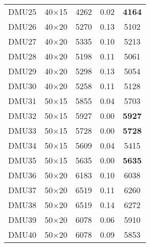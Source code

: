 \begin{table}[H]
\begin{tabular}{@{}ccccc@{}}
DMU25 & 40$\times$15 & 4262 & 0.02 & \textbf{4164}\\ 
DMU26 & 40$\times$20 & 5270 & 0.13 & 5102\\ 
DMU27 & 40$\times$20 & 5335 & 0.10 & 5213\\ 
DMU28 & 40$\times$20 & 5198 & 0.11 & 5061\\ 
DMU29 & 40$\times$20 & 5298 & 0.13 & 5054\\ 
DMU30 & 40$\times$20 & 5258 & 0.11 & 5128\\ 
DMU31 & 50$\times$15 & 5855 & 0.04 & 5703\\ 
DMU32 & 50$\times$15 & 5927 & 0.00 & \textbf{5927}\\ 
DMU33 & 50$\times$15 & 5728 & 0.00 & \textbf{5728}\\ 
DMU34 & 50$\times$15 & 5609 & 0.04 & 5415\\ 
DMU35 & 50$\times$15 & 5635 & 0.00 & \textbf{5635}\\ 
DMU36 & 50$\times$20 & 6183 & 0.10 & 6038\\ 
DMU37 & 50$\times$20 & 6519 & 0.11 & 6260\\ 
DMU38 & 50$\times$20 & 6519 & 0.14 & 6272\\ 
DMU39 & 50$\times$20 & 6078 & 0.06 & 5910\\ 
DMU40 & 50$\times$20 & 6078 & 0.09 & 5853\\ \bottomrule
\end{tabular}
\end{table}

